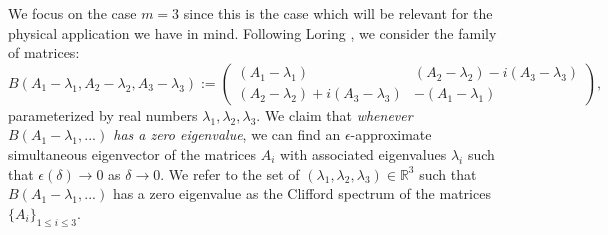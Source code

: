 \documentclass[a4paper]{article}
\begin{document}
We focus on the case $m = 3$ since this is the case which will be relevant for the physical application we have in mind. Following Loring \cite{need ref}, we consider the family of matrices: 
\begin{equation} \label{eq:B_matrix}
	B(A_1 - \lambda_1,A_2 - \lambda_2,A_3 - \lambda_3) := \begin{pmatrix} (A_1 - \lambda_1) & (A_2 - \lambda_2) - i (A_3 - \lambda_3) \\ (A_2 - \lambda_2) + i (A_3 - \lambda_3) & - (A_1 - \lambda_1) \end{pmatrix},
\end{equation}
parameterized by real numbers $\lambda_1, \lambda_2, \lambda_3$. We claim that \emph{whenever $B(A_1-\lambda_1,...)$ has a zero eigenvalue}, we can find an $\epsilon$-approximate simultaneous eigenvector of the matrices $A_i$ with associated eigenvalues $\lambda_i$ such that $\epsilon(\delta) \rightarrow 0$ as $\delta \rightarrow 0$. We refer to the set of $(\lambda_1,\lambda_2,\lambda_3) \in \mathbb{R}^3$ such that $B(A_1 - \lambda_1,...)$ has a zero eigenvalue as the {Clifford spectrum} of the matrices $\{ A_i \}_{1 \leq i \leq 3}$.
\end{document}
